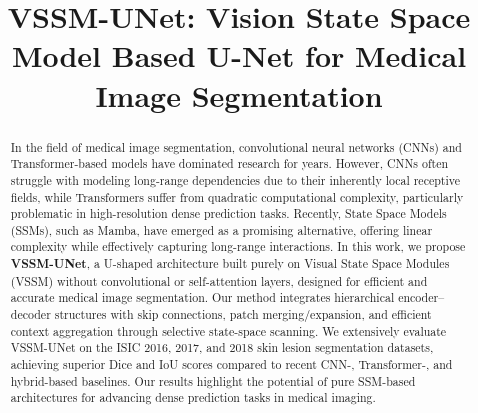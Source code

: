 \documentclass[conference]{IEEEtran}
\begin{document}
\title{VSSM-UNet: Vision State Space Model Based U-Net for Medical Image Segmentation}

\author{
\and
{}
\and
{}
}

\maketitle

\begin{abstract}
In the field of medical image segmentation, convolutional neural networks (CNNs) and Transformer-based models have dominated research for years. However, CNNs often struggle with modeling long-range dependencies due to their inherently local receptive fields, while Transformers suffer from quadratic computational complexity, particularly problematic in high-resolution dense prediction tasks. Recently, State Space Models (SSMs), such as Mamba, have emerged as a promising alternative, offering linear complexity while effectively capturing long-range interactions. In this work, we propose \textbf{VSSM-UNet}, a U-shaped architecture built purely on Visual State Space Modules (VSSM) without convolutional or self-attention layers, designed for efficient and accurate medical image segmentation. Our method integrates hierarchical encoder–decoder structures with skip connections, patch merging/expansion, and efficient context aggregation through selective state-space scanning. We extensively evaluate VSSM-UNet on the ISIC 2016, 2017, and 2018 skin lesion segmentation datasets, achieving superior Dice and IoU scores compared to recent CNN-, Transformer-, and hybrid-based baselines. Our results highlight the potential of pure SSM-based architectures for advancing dense prediction tasks in medical imaging.
\end{abstract}
\end{document}
